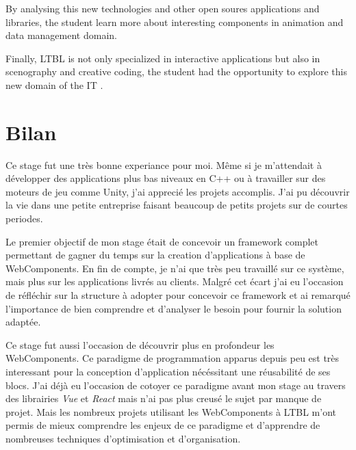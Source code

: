 \documentclass{article}
\begin{document}
    By analysing this new technologies and other open soures applications and libraries, the student learn more about interesting components in animation and data management domain.

    Finally, LTBL is not only specialized in interactive applications but also in scenography and creative coding,
    the student had the opportunity to explore this new domain of the IT .

    

    

    

    

    

    

    

    \section{Bilan}

    Ce stage fut une très bonne experiance pour moi.
    Même si je m'attendait à développer des applications plus bas niveaux en C++ ou à travailler sur des moteurs de jeu comme Unity, j'ai apprecié les projets accomplis.
    J'ai pu découvrir la vie dans une petite entreprise faisant beaucoup de petits projets sur de courtes periodes.

    Le premier objectif de mon stage était de concevoir un framework complet permettant de gagner du temps sur la creation d'applications à base de WebComponents.
    En fin de compte, je n'ai que très peu travaillé sur ce système, mais plus sur les applications livrés au clients.
    Malgré cet écart j'ai eu l'occasion de réfléchir sur la structure à adopter pour concevoir ce framework et ai remarqué l'importance de bien comprendre et d'analyser le besoin pour fournir la solution adaptée.

    Ce stage fut aussi l'occasion de découvrir plus en profondeur les WebComponents.
    Ce paradigme de programmation apparus depuis peu est très interessant pour la conception d'application nécéssitant une réusabilité de ses blocs.
    J'ai déjà eu l'occasion de cotoyer ce paradigme avant mon stage au travers des librairies \emph{Vue} et \emph{React} mais n'ai pas plus creusé le sujet par manque de projet.
    Mais les nombreux projets utilisant les WebComponents à LTBL m'ont permis de mieux comprendre les enjeux de ce paradigme et d'apprendre de nombreuses techniques d'optimisation et d'organisation.
\end{document}
